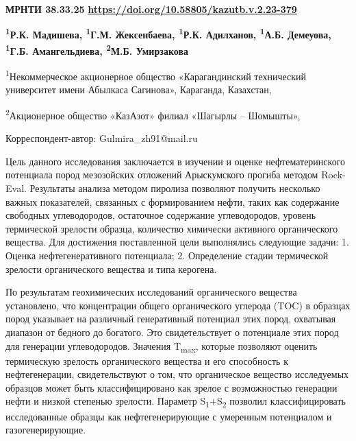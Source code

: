 \newpage
{\bfseries МРНТИ 38.33.25}
\hfill {\bfseries \href{https://doi.org/10.58805/kazutb.v.2.23-379}{https://doi.org/10.58805/kazutb.v.2.23-379}}


\begin{center}
{\bfseries \textsuperscript{1}Р.К. Мадишева, \textsuperscript{1}Г.М. Жексенбаева\envelope, \textsuperscript{1}Р.К. Адилханов, \textsuperscript{1}А.Б. Демеуова, \textsuperscript{1}Г.Б. Амангельдиева, \textsuperscript{2}М.Б. Умирзакова}

\textsuperscript{1}Некоммерческое акционерное общество «Карагандинский
технический университет имени Абылкаса Сагинова», Караганда, Казахстан,

\textsuperscript{2}Акционерное общество «КазАзот» филиал «Шагырлы --
Шомышты»,

\envelope Корреспондент-автор: Gulmira\_zh91@mail.ru
\end{center}

Цель данного исследования заключается в изучении и оценке
нефтематеринского потенциала пород мезозойских отложений Арыскумского
прогиба методом Rock-Eval. Результаты анализа методом пиролиза позволяют
получить несколько важных показателей, связанных с формированием нефти,
таких как содержание свободных углеводородов, остаточное содержание
углеводородов, уровень термической зрелости образца, количество
химически активного органического вещества. Для достижения поставленной
цели выполнялись следующие задачи: 1. Оценка нефтегенеративного
потенциала; 2. Определение стадии термической зрелости органического
вещества и типа керогена.

По результатам геохимических исследований органического вещества
установлено, что концентрации общего органического углерода (TOC) в
образцах пород указывает на различный генеративный потенциал этих пород,
охватывая диапазон от бедного до богатого. Это свидетельствует о
потенциале этих пород для генерации углеводородов. Значения
T\textsubscript{max}, которые позволяют оценить термическую зрелость
органического вещества и его способность к нефтегенерации,
свидетельствуют о том, что органическое вещество исследуемых образцов
может быть классифицировано как зрелое с возможностью генерации нефти и
низкой степенью зрелости. Параметр S\textsubscript{1}+S\textsubscript{2}
позволил классифицировать исследованные образцы как нефтегенерирующие с
умеренным потенциалом и газогенерирующие.

